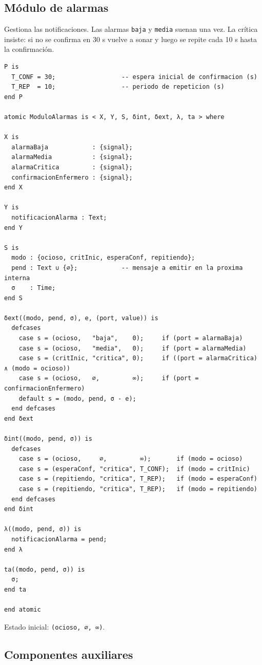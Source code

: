 \documentclass[11pt,a4paper]{article}
\begin{document}
\subsection{Módulo de alarmas}

Gestiona las notificaciones. Las alarmas \texttt{baja} y \texttt{media} suenan una vez. La crítica insiste: si no se confirma en 30 s vuelve a sonar y luego se repite cada 10 s hasta la confirmación.

\begin{lstlisting}[style=cml]
P is
  T_CONF = 30;                  -- espera inicial de confirmacion (s)
  T_REP  = 10;                  -- periodo de repeticion (s)
end P

atomic ModuloAlarmas is < X, Y, S, δint, δext, λ, ta > where

X is
  alarmaBaja            : {signal};
  alarmaMedia           : {signal};
  alarmaCritica         : {signal};
  confirmacionEnfermero : {signal};
end X

Y is
  notificacionAlarma : Text;
end Y

S is
  modo : {ocioso, critInic, esperaConf, repitiendo};
  pend : Text ∪ {∅};            -- mensaje a emitir en la proxima interna
  σ    : Time;
end S

δext((modo, pend, σ), e, (port, value)) is
  defcases
    case s = (ocioso,   "baja",    0);     if (port = alarmaBaja)
    case s = (ocioso,   "media",   0);     if (port = alarmaMedia)
    case s = (critInic, "critica", 0);     if ((port = alarmaCritica) ∧ (modo = ocioso))
    case s = (ocioso,   ∅,         ∞);     if (port = confirmacionEnfermero)
    default s = (modo, pend, σ - e);
  end defcases
end δext

δint((modo, pend, σ)) is
  defcases
    case s = (ocioso,     ∅,         ∞);       if (modo = ocioso)
    case s = (esperaConf, "critica", T_CONF);  if (modo = critInic)
    case s = (repitiendo, "critica", T_REP);   if (modo = esperaConf)
    case s = (repitiendo, "critica", T_REP);   if (modo = repitiendo)
  end defcases
end δint

λ((modo, pend, σ)) is
  notificacionAlarma = pend;
end λ

ta((modo, pend, σ)) is
  σ;
end ta

end atomic
\end{lstlisting}

\noindent Estado inicial: \texttt{(ocioso, ∅, ∞)}.

\subsection{Componentes auxiliares}\label{sec:auxiliares}
\end{document}
